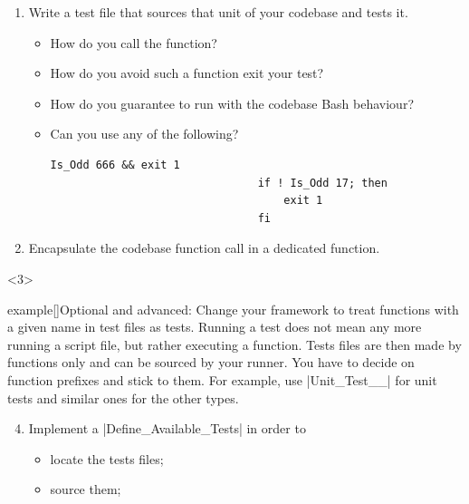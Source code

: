 \begin{frame}
\begin{onlyenv}
\begin{enumerate}
            \item Write a test file that sources that unit of your codebase and tests it.
                  \begin{itemize}
                      \item How do you call the function?
                      \item How do you avoid such a function exit your test?
                      \item How do you guarantee to run with the codebase Bash behaviour?
                      \item Can you use any of the following?
                            \begin{lstlisting}[style=MyBash, numbers=none, aboveskip=3mm, belowskip=-5mm, style=smaller, xleftmargin=2mm, xrightmargin=30mm]
                                Is_Odd 666 && exit 1
                                if ! Is_Odd 17; then
                                    exit 1
                                fi
                            \end{lstlisting}
                  \end{itemize}
            \item Encapsulate the codebase function call in a dedicated function.
        \end{enumerate}
    \end{onlyenv}
    \begin{onlyenv}<3>
        \begin{varblock}{example}[\textwidth]{Optional and advanced:}
            Change your framework to treat functions with a given name in test files as tests.
            Running a test does not mean any more running a script file, but rather executing a function.
            Tests files are then made by functions only and can be sourced by your runner.
            You have to decide on function prefixes and stick to them.
            For example, use \bash|Unit_Test__| for unit tests and similar ones for the other types.
        \end{varblock}
        \begin{enumerate}
            \setcounter{enumi}{3}
            \item Implement a \bash|Define_Available_Tests| in order to\\
                  \begin{itemize}
                      \item locate the tests files;
                      \item source them;

\end{itemize}
\end{enumerate}
\end{onlyenv}
\end{frame}
